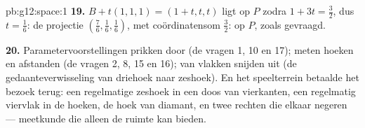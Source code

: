\begin{solution}{pb:g12:space:1}
\textbf{19.} $B + t(1,1,1) = (1 + t, t, t)$ ligt op $P$ zodra
$1 + 3t = \frac32$, dus $t = \frac16$: de projectie
$\left(\frac76, \frac16, \frac16\right)$, met coördinatensom $\frac32$: op
$P$, zoals gevraagd.

\textbf{20.} Parametervoorstellingen prikken door (de vragen 1, 10 en 17);
 meten hoeken en afstanden (de vragen 2, 8, 15 en 16);
 van vlakken snijden  uit (de gedaanteverwisseling van
driehoek naar zeshoek). En het speelterrein betaalde het bezoek terug: een
regelmatige zeshoek in een doos van vierkanten, een regelmatig viervlak in de
hoeken, de hoek van diamant, en twee rechten die elkaar negeren --- meetkunde
die alleen de ruimte kan bieden.
\end{solution}
